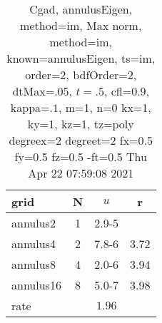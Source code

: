 \begin{table}[H]\tableFont %
\begin{center}
\begin{tabular}{|l|c|c|c|} \hline 
grid  & N &  $ u $ & r \\ \hline 
  annulus2 &     1 & \num{2.9}{-5} &        \\ \hline
  annulus4 &     2 & \num{7.8}{-6} &  3.72  \\ \hline
  annulus8 &     4 & \num{2.0}{-6} &  3.94  \\ \hline
 annulus16 &     8 & \num{5.0}{-7} &  3.98  \\ \hline
    rate             &       &  $1.96$       &       \\ \hline
\end{tabular}
\caption{Cgad, annulusEigen, method=im, Max norm, method=im, known=annulusEigen, ts=im, order=$2$, bdfOrder=2, dtMax=$.05$, $t=.5$, cfl=$0.9$, kappa=$.1$, m=1, n=0 kx=1, ky=1, kz=1,  tz=poly degreex=2 degreet=2 fx=0.5 fy=0.5 fz=0.5 -ft=0.5 Thu Apr 22 07:59:08 2021}\label{table:annulusEigenimOrder2Max}
\end{center}
\end{table}
